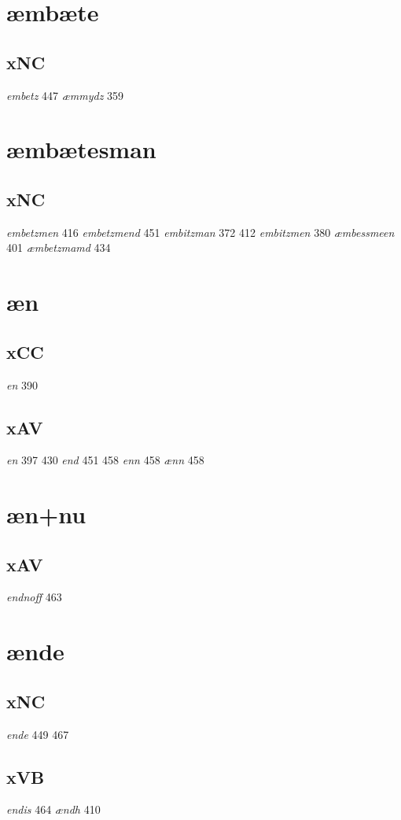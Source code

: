 \documentclass[a4paper,twocolumn]{article}
\begin{document}
\section{æmbæte}
\label{sec:orgc6c29a4}
\subsection{xNC}
\label{sec:orga556d15}
\emph{embetz} 447 \emph{æmmydz} 359 
\section{æmbætesman}
\label{sec:orga3afcc3}
\subsection{xNC}
\label{sec:org633cf9c}
\emph{embetzmen} 416 \emph{embetzmend} 451 \emph{embitzman} 372 412 \emph{embitzmen} 380 \emph{æmbessmeen} 401 \emph{æmbetzmamd} 434 
\section{æn}
\label{sec:orgb2e3040}
\subsection{xCC}
\label{sec:orgc61ab01}
\emph{en} 390 
\subsection{xAV}
\label{sec:orge1aa9ec}
\emph{en} 397 430 \emph{end} 451 458 \emph{enn} 458 \emph{ænn} 458 
\section{æn+nu}
\label{sec:org791af4e}
\subsection{xAV}
\label{sec:org6dc6555}
\emph{endnoff} 463 
\section{ænde}
\label{sec:orgf8090af}
\subsection{xNC}
\label{sec:orge329f1d}
\emph{ende} 449 467 
\subsection{xVB}
\label{sec:org590c4d2}
\emph{endis} 464 \emph{ændh} 410 
\end{document}
